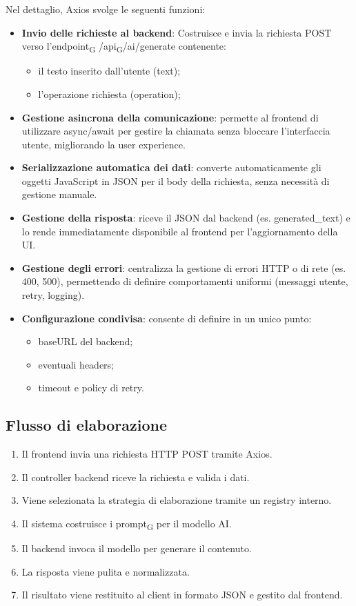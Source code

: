 \documentclass[11pt,a4paper]{article}
\newcommand{\gls}[1]{#1\textsubscript{G}}
\begin{document}
Nel dettaglio, Axios svolge le seguenti funzioni:
\begin{itemize}
\item \textbf{Invio delle richieste al backend}:
Costruisce e invia la richiesta POST verso l’\gls{endpoint} /\gls{api}/ai/generate contenente:
\begin{itemize}[label=\textbullet]
\item il testo inserito dall’utente (text);
\item l’operazione richiesta (operation);
\end{itemize}

\item \textbf{Gestione asincrona della comunicazione}: permette al frontend di utilizzare async/await per gestire la chiamata senza bloccare l’interfaccia utente, migliorando la user experience.
\item \textbf{Serializzazione automatica dei dati}: converte automaticamente gli oggetti JavaScript in JSON per il body della richiesta, senza necessità di gestione manuale.
\item \textbf{Gestione della risposta}: riceve il JSON dal backend (es. generated\_text) e lo rende immediatamente disponibile al frontend per l’aggiornamento della UI.
\item \textbf{Gestione degli errori}: centralizza la gestione di errori HTTP o di rete (es. 400, 500), permettendo di definire comportamenti uniformi (messaggi utente, retry, logging).
\item \textbf{Configurazione condivisa}: consente di definire in un unico punto:
\begin{itemize}[label=\textbullet]
\item baseURL del backend;
\item eventuali headers;
\item timeout e policy di retry.
\end{itemize}
\end{itemize}

\subsection{Flusso di elaborazione}
\begin{enumerate}
\item Il frontend invia una richiesta HTTP POST tramite Axios.
\item Il controller backend riceve la richiesta e valida i dati.
\item Viene selezionata la strategia di elaborazione tramite un registry interno.
\item Il sistema costruisce i \gls{prompt} per il modello AI.
\item Il backend invoca il modello per generare il contenuto.
\item La risposta viene pulita e normalizzata.
\item Il risultato viene restituito al client in formato JSON e gestito dal frontend.
\end{enumerate}
\end{document}
